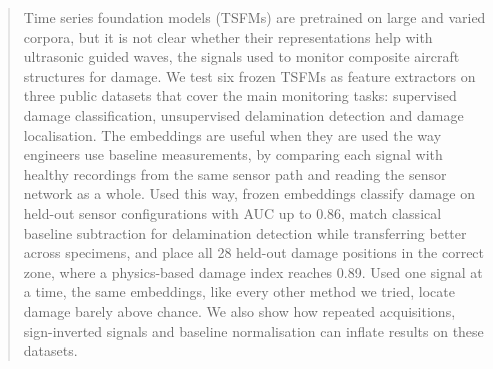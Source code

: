 \documentclass{article}
\begin{document}

\printAffiliationsAndNotice{}

\begin{abstract}
Time series foundation models (TSFMs) are pretrained on large and varied corpora, but it is not clear
whether their representations help with ultrasonic guided waves, the signals used to monitor composite
aircraft structures for damage. We test six frozen TSFMs as feature extractors on three public datasets
that cover the main monitoring tasks: supervised damage classification, unsupervised delamination
detection and damage localisation. The embeddings are useful when they are used the way engineers use
baseline measurements, by comparing each signal with healthy recordings from the same sensor path and
reading the sensor network as a whole. Used this way, frozen embeddings classify damage on held-out sensor
configurations with AUC up to 0.86, match classical baseline subtraction for delamination detection while
transferring better across specimens, and place all 28 held-out damage positions in the correct zone,
where a physics-based damage index reaches 0.89. Used one signal at a time, the same embeddings, like
every other method we tried, locate damage barely above chance. We also show how repeated acquisitions,
sign-inverted signals and baseline normalisation can inflate results on these datasets.
\end{abstract}
\end{document}
